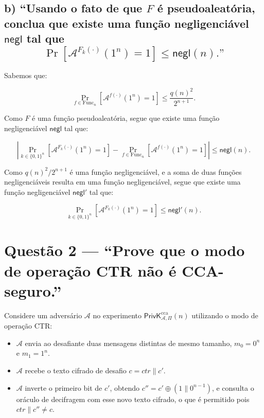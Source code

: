 \documentclass[11pt,a4paper]{article}
\newcommand{\negl}{\mathsf{negl}}
\begin{document}
    \clearpage

    \subsection*{b) ``Usando o fato de que $F$ é pseudoaleatória, conclua que existe uma
    função negligenciável $\negl$ tal que
        \[
            \Pr\!\left[\mathcal{A}^{F_k(\cdot)}(1^{n}) = 1\right] \le \negl(n).\text{''}
        \]}

    Sabemos que:

    \[
        \Pr_{f \in \mathrm{Func}_n}\left[\mathcal{A}^{f(\cdot)}(1^n) = 1\right]
        \le \frac{q(n)^2}{2^{n+1}}.
    \]

    Como $F$ é uma função pseudoaleatória, segue que existe uma função
    negligenciável $\negl$ tal que:

    \[
        \left|
            \Pr_{k \in \{0,1\}^n}\left[\mathcal{A}^{F_k(\cdot)}(1^n) = 1\right]
            - \Pr_{f \in \mathrm{Func}_n}\left[\mathcal{A}^{f(\cdot)}(1^n) = 1\right]
        \right| \le \negl(n).
    \]

    Como $q(n)^2/2^{n+1}$ é uma função negligenciável, e a soma de duas
    funções negligenciáveis resulta em uma função negligenciável, segue que
    existe uma função negligenciável $\negl'$ tal que:

    \[
        \Pr_{k \in \{0,1\}^n}\left[\mathcal{A}^{F_k(\cdot)}(1^n) = 1\right]
        \le \negl'(n).
    \]

    \clearpage

    \section*{Questão 2 --- ``Prove que o modo de operação CTR não é CCA-seguro.''}

    Considere um adversário $\mathcal{A}$ no experimento
    $\mathsf{PrivK}^{\mathrm{cca}}_{\mathcal{A},\Pi}(n)$ utilizando o modo de operação CTR:

    \begin{itemize}

        \item $\mathcal{A}$ envia ao desafiante duas mensagens distintas de mesmo tamanho,
        $m_0 = 0^{n}$ e $m_1 = 1^{n}$.

        \item $\mathcal{A}$ recebe o texto cifrado de desafio $c = ctr \| c'$.

        \item $\mathcal{A}$ inverte o primeiro bit de $c'$, obtendo $c'' = c' \oplus (1\|0^{n-1})$,
        e consulta o oráculo de decifragem com esse novo texto cifrado, o que é permitido
        pois $ctr \| c'' \neq c$.

    \end{itemize}
\end{document}
